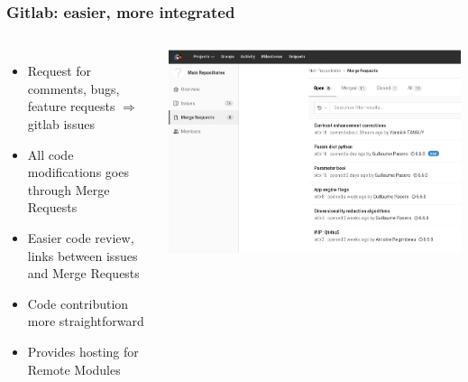 \documentclass[8pt]{beamer}
\begin{document}
\begin{frame}
  \frametitle{Gitlab: easier, more integrated}
  \begin{columns}
    \begin{itemize}
    \item Request for comments, bugs, feature requests $\Rightarrow$ gitlab issues
    \item All code modifications goes through Merge Requests
    \item Easier code review, links between issues and Merge Requests
    \item Code contribution more straightforward
    \item Provides hosting for Remote Modules
    \end{itemize}
    \includegraphics[width=\textwidth]{images/gitlab_mr.png}
    \end{columns}
\end{frame}
\end{document}
